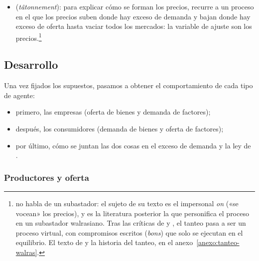 \documentclass[11pt]{article}
\begin{document}
\begin{itemize}
\item {} (\emph{tâtonnement}): para explicar cómo se forman los precios,  recurre a un proceso en el que los precios suben donde hay exceso de demanda y bajan donde hay exceso de oferta hasta vaciar todos los mercados: la variable de ajuste son los precios.\footnote{ no habla de un subastador: el sujeto de su texto es el impersonal \emph{on} («se vocean» los precios), y es la literatura posterior la que personifica el proceso en un subastador walrasiano. Tras las críticas de  y , el tanteo pasa a ser un proceso virtual, con compromisos escritos (\emph{bons}) que solo se ejecutan en el equilibrio. El texto de  y la historia del tanteo, en el anexo~\ref{anexo:tanteo-walras}.}
\end{itemize}

\subsection{Desarrollo}\label{sec:desarrollo}

Una vez fijados los supuestos, pasamos a obtener el comportamiento de cada tipo de agente:
\begin{itemize}
\item primero, las empresas (oferta de bienes y demanda de factores);
\item después, los consumidores (demanda de bienes y oferta de factores);
\item por último, cómo se juntan las dos cosas en el exceso de demanda y la ley de .
\end{itemize}

\subsubsection{Productores y oferta}\label{sec:productores-oferta}
\end{document}
